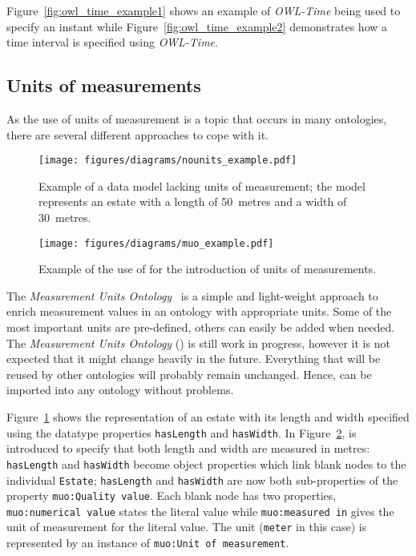 Figure~\ref{fig:owl_time_example1} shows an example of \emph{OWL-Time} being used to specify an instant while Figure~\ref{fig:owl_time_example2} demonstrates how a time interval is specified using \emph{OWL-Time}.

\subsection{Units of measurements}
\label{subsec:unit_ontologies}

As the use of units of measurement is a topic that occurs in many ontologies, there are several different approaches to cope with it.

\begin{figure}
\centering
\texttt{[image: figures/diagrams/nounits\_example.pdf]}
\caption{Example of a data model lacking units of measurement; the model represents an estate with a length of \SI{50}{metres} and a width of \SI{30}{metres}.}
\label{fig:nounits_example}
\end{figure}

\begin{figure}
\centering
\texttt{[image: figures/diagrams/muo\_example.pdf]}
\caption{Example of the use of \muo for the introduction of units of measurements.}
\label{fig:muo_example}
\end{figure}

The \emph{Measurement Units Ontology}~\cite{MUOWeb,MUO} is a simple and light-weight approach to enrich measurement values in an ontology with appropriate units. Some of the most important units are pre-defined, others can easily be added when needed. The \emph{Measurement Units Ontology} (\muo) is still work in progress, however it is not expected that it might change heavily in the future. Everything that will be reused by other ontologies will probably remain unchanged. Hence, \muo can be imported into any ontology without problems.

Figure~\ref{fig:nounits_example} shows the representation of an estate with its length and width specified using the datatype properties \texttt{hasLength} and \texttt{hasWidth}. In Figure~\ref{fig:muo_example}, \muo is introduced to specify that both length and width are measured in metres: \texttt{hasLength} and \texttt{hasWidth} become object properties which link blank nodes to the individual \texttt{Estate}; \texttt{hasLength} and \texttt{hasWidth} are now both sub-properties of the property \texttt{muo:Quality value}. Each blank node has two properties, \texttt{muo:numerical value} states the literal value while \texttt{muo:measured in} gives the unit of measurement for the literal value. The unit (\texttt{meter} in this case) is represented by an instance of \texttt{muo:Unit of measurement}.

